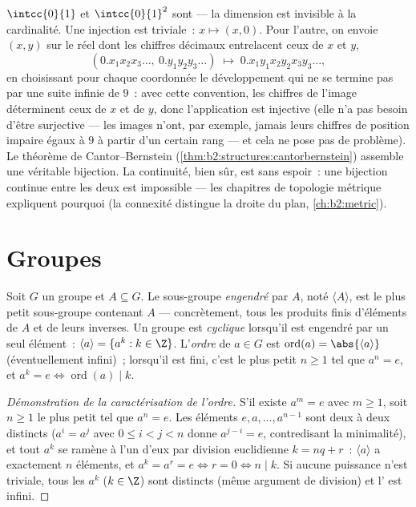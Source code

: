 \begin{example}\label{ex:b2:structures:squareseg}
$\intcc{0}{1}$ et $\intcc{0}{1}^2$ sont  --- la dimension
est invisible à la cardinalité. Une injection est triviale~: $x
\mapsto (x, 0)$. Pour l'autre, on envoie $(x, y)$ sur le réel dont
les chiffres décimaux entrelacent ceux de $x$ et $y$,
\[
(0.x_1x_2x_3\dots,\ 0.y_1y_2y_3\dots)
\;\longmapsto\; 0.x_1y_1x_2y_2x_3y_3\dots,
\]
en choisissant pour chaque coordonnée le développement qui ne se
termine pas par une suite infinie de $9$~: avec cette convention,
les chiffres de l'image déterminent ceux de $x$ et de $y$, donc
l'application est injective (elle n'a pas besoin d'être surjective
--- les images n'ont, par exemple, jamais leurs chiffres de
position impaire égaux à $9$ à partir d'un certain rang --- et cela
ne pose pas de problème). Le théorème de Cantor--Bernstein
(\cref{thm:b2:structures:cantorbernstein}) assemble une véritable
bijection. La continuité, bien sûr, est sans espoir~: une bijection
continue entre les deux est impossible --- les chapitres de
topologie métrique expliquent pourquoi (la connexité distingue la
droite du plan, \cref{ch:b2:metric}).
\end{example}

\section{Groupes}

\begin{definition}\label{def:b2:structures:generated}
Soit $G$ un groupe et $A \subseteq G$. Le sous-groupe \emph{engendré}
par $A$, noté $\langle A \rangle$, est le plus petit sous-groupe
contenant $A$ --- concrètement, tous les produits finis d'éléments de
$A$ et de leurs inverses. Un groupe est \emph{cyclique} lorsqu'il est engendré par un seul élément~: $\langle a\rangle
= \{a^k : k \in \Z\}$. L'\emph{ordre} de $a
\in G$ est $\operatorname{ord}(a) = \abs{\langle a \rangle}$
(éventuellement infini)~; lorsqu'il est fini, c'est le plus petit $n
\geq 1$ tel que $a^n = e$, et $a^k = e \iff \operatorname{ord}(a) \mid
k$.
\end{definition}

\begin{proof}[Démonstration de la caractérisation de l'ordre]
S'il existe $a^m = e$ avec $m \geq 1$, soit $n \geq 1$ le plus petit
tel que $a^n = e$. Les éléments $e, a, \dots, a^{n-1}$ sont deux à deux
distincts ($a^{i} = a^{j}$ avec $0 \leq i < j < n$ donne $a^{j-i} = e$,
contredisant la minimalité), et tout $a^k$ se ramène à l'un d'eux par
division euclidienne $k = nq + r$~: $\langle a\rangle$ a exactement $n$
éléments, et $a^k = a^r = e \iff r = 0 \iff n \mid k$. Si aucune
puissance n'est triviale, tous les $a^k$ ($k \in \Z$) sont distincts
(même argument de division) et l' est infini.
\end{proof}

